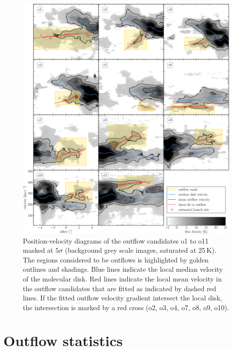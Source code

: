 \begin{figure}[p]
	\centering
	\includegraphics[width=\linewidth]{images/chapters/papers/outflow_catalog/fig8.pdf}
	\caption[Position-velocity diagrams of outflow candidates]{Position-velocity diagrams of the  outflow candidates o1 to o11 masked at $5 \sigma$ (background grey scale images, saturated at 25\,K). The regions considered to be outflows is highlighted by golden outlines and shadings. Blue lines indicate the local median velocity of the molecular disk. Red lines indicate the local mean velocity in the outflow candidates that are fitted as indicated by dashed red lines. If the fitted outflow velocity gradient intersect the local disk, the intersection is marked by a red cross (o2, o3, o4, o7, o8, o9, o10).}
	\label{outflow catalog: figure: outflow catalog pV}
\end{figure}



\section{Outflow statistics}\label{outflow catalog: section: statistics}

